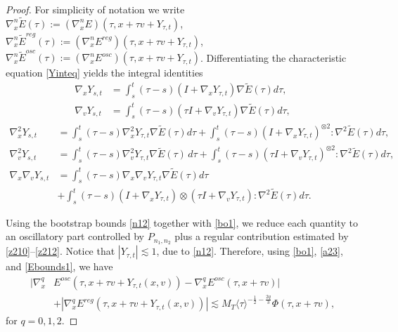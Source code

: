 \documentclass[10pt,a4paper]{amsart}
\theoremstyle{plain}
\begin{document}
\begin{proof}
	For simplicity of notation we write $\nabla_x^n\widetilde{E}(\tau):=(\nabla_x^nE)(\tau,x+\tau v+Y_{\tau,t})$, $\nabla_x^n\widetilde{E}^{reg}(\tau):=(\nabla_x^nE^{reg})(\tau,x+\tau v+Y_{\tau,t})$, $\nabla_x^n\widetilde{E}^{osc}(\tau):=(\nabla_x^nE^{osc})(\tau,x+\tau v+Y_{\tau,t})$. Differentiating the characteristic equation \eqref{Yinteq} yields the integral identities
	\begin{equation}\label{nabla1Y}
		\begin{split}
			\nabla_xY_{s,t}&=\int_s^t(\tau-s)(I+\nabla_{x}Y_{\tau,t})\nabla \widetilde{E}(\tau)d\tau,\\
			\nabla_vY_{s,t}&=\int_s^t(\tau-s)(\tau I+\nabla_{v}Y_{\tau,t})\nabla \widetilde{E}(\tau)d\tau,
		\end{split}
	\end{equation}
	\begin{equation}\label{nabla2Y}
		\begin{split}
			\nabla_x^2Y_{s,t}&=\int_s^t(\tau-s)\nabla_{x}^2Y_{\tau,t}\nabla \widetilde{E}(\tau)d\tau+\int_s^t(\tau-s)(I+\nabla_{x}Y_{\tau,t})^{\otimes 2}:\nabla^2 \widetilde{E}(\tau)d\tau,\\
			\nabla_v^2Y_{s,t}&=\int_s^t(\tau-s)\nabla_{v}^2Y_{\tau,t}\nabla \widetilde{E}(\tau)\,d\tau+\int_s^t(\tau-s)(\tau I+\nabla_{v}Y_{\tau,t})^{\otimes 2}:\nabla^2 \widetilde{E}(\tau)d\tau,\\
			\nabla_x\nabla_{v}Y_{s,t}&=\int_s^t(\tau-s)\nabla_{x}\nabla_vY_{\tau,t}\nabla \widetilde{E}(\tau)d\tau\\
			&+\int_s^t(\tau-s)(I+\nabla_{x}Y_{\tau,t})\otimes (\tau I+\nabla_{v}Y_{\tau,t}):\nabla^2 \widetilde{E}(\tau)d\tau.
		\end{split}
	\end{equation}
	
	Using the bootstrap bounds \eqref{n12} together with \eqref{bo1}, we reduce each quantity to an oscillatory part controlled by $P_{n_1,n_2}$ plus a regular contribution estimated by \eqref{z210}--\eqref{z212}. Notice that $|Y_{\tau,t}|\lesssim1$, due to \eqref{n12}. Therefore, using \eqref{bo1}, \eqref{a23}, and \eqref{Ebounds1}, we have
	\begin{equation}\label{Ecomp}
		\begin{split}
			|\nabla_x^q&E^{osc}(\tau,x+\tau v+Y_{\tau,t}(x,v))
			-\nabla_x^qE^{osc}(\tau,x+\tau v)|\\
			&+|\nabla_x^qE^{reg}(\tau,x+\tau v+Y_{\tau,t}(x,v))|\lesssim M_T\langle\tau\rangle^{-\frac12-\frac{2q}{3}}\Phi(\tau,x+\tau v),
		\end{split}
	\end{equation}
	for $q=0,1,2$. 
	

\end{proof}
\end{document}
